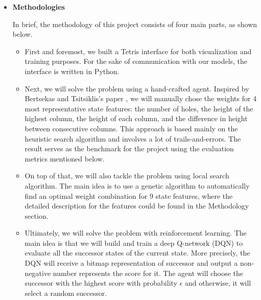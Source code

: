 \documentclass[letterpaper]{article} %
\begin{document}
\begin{itemize}
\item 
{\bf Methodologies}

In brief, the methodology of this project consists of four main parts, as shown below.
\begin{itemize}
  \item 
  First and foremost, we built a Tetris interface for both visualization and training purposes. For the sake of communication with our models, the interface is written in Python. 
  \item 
  Next, we {will solve} the problem using a hand-crafted agent. {Inspired by Bertsekas and Tsitsiklis's paper} \cite{Bertsekas_1996}, we will manually chose the weights for 4 most representative state features: the number of holes, the height of the highest column, the height of each column, and the difference in height between consecutive columns. This approach is based mainly on the heuristic search algorithm and involves a lot of trails-and-errors. The result serves as the benchmark for the project {using the evaluation metrics mentioned below}.
  \item 
  On top of that, we will also tackle the problem {using local search algorithm}. The main idea is to use a genetic algorithm to automatically find an optimal weight combination for 9 state features, where the detailed description for the features could be found in the Methodology section. 
  
  \item {Ultimately, we will solve the problem with reinforcement learning. The main idea is that we will build and train a deep Q-network (DQN) to evaluate all the successor states of the current state. More precisely, the DQN will receive a bitmap representation of successor and output a non-negative number represents the score for it. The agent will choose the successor with the highest score with probability $\epsilon$ and otherwise, it will select a random successor.}


\end{itemize}
\end{itemize}
\end{document}
